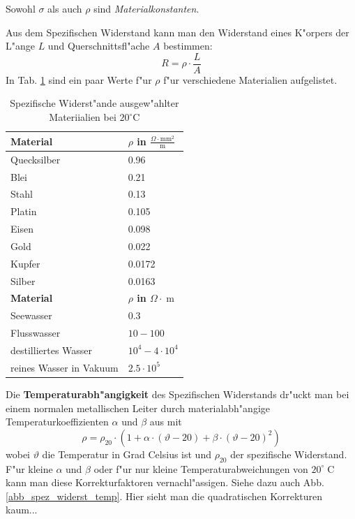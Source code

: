\begin{Wichtig}
   Sowohl $\sigma$ als auch $\rho$ sind \emph{Materialkonstanten}.
\end{Wichtig}

Aus dem Spezifischen Widerstand kann man den Widerstand eines K"orpers
der L"ange $L$ und Querschnittsfl"ache $A$ bestimmen:
\begin{equation}
   \label{eqn_differenz-c73}
   R = \rho \cdot \frac{L}{A}
\end{equation}
In Tab. \ref{tab_spez_widerst} sind ein paar Werte f"ur $\rho$ f"ur
verschiedene Materialien aufgelistet.

\begin{table}
   \centering
   \begin{tabular}{l l}
\toprule
      \textbf{Material} & \textbf{$\rho$ in $\frac{\Omega \cdot
          \operatorname{mm^2}}{\operatorname{m}}$} \\
\midrule
Quecksilber & 0.96\\
Blei & 0.21 \\
Stahl & 0.13 \\
Platin & 0.105\\
Eisen & 0.098 \\
Gold & 0.022 \\
Kupfer & 0.0172\\
Silber & 0.0163\\
\toprule
\textbf{Material} & \textbf{$\rho$ in $ \Omega \cdot \operatorname{m}$}\\
\midrule
Seewasser & 0.3\\
Flusswasser & $10-100$\\
destilliertes Wasser & $10^{4} - 4 \cdot 10^4$\\
reines Wasser in Vakuum & $2.5 \cdot 10^{5}$\\
\bottomrule
   \end{tabular}
   \caption{Spezifische Widerst"ande ausgew"ahlter Materiialien bei $20^\circ$C}
   \label{tab_spez_widerst}
\end{table}

\bigskip

Die \textbf{Temperaturabh"angigkeit} des Spezifischen Widerstands
dr"uckt man bei einem normalen metallischen Leiter durch
materialabh"angige Temperaturkoeffizienten $\alpha$ und $\beta$ aus mit
\begin{equation}
   \label{eqn_differenz-c75}
   \rho = \rho_{20} \cdot \left (1 + \alpha \cdot (\vartheta - 20) + \beta
      \cdot (\vartheta - 20)^2 \right )
\end{equation}
wobei $\vartheta$ die Temperatur in Grad Celsius ist und $\rho_{20}$ der
spezifische Widerstand. F"ur kleine $\alpha$ und $\beta$ oder f"ur nur
kleine Temperaturabweichungen von $20^\circ\operatorname{C}$ kann man
diese Korrekturfaktoren vernachl"assigen. Siehe dazu auch
Abb. \ref{abb_spez_widerst_temp}. Hier sieht man die quadratischen
Korrekturen kaum...

